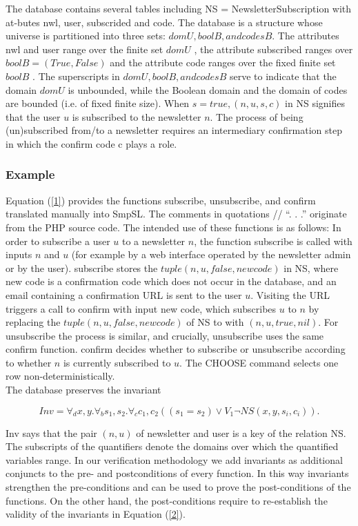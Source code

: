 \documentclass[12pt]{acmart}
\begin{document}
The database contains several tables including NS = NewsletterSubscription with at-butes nwl, user, subscrided and code. The database is a structure whose universe is partitioned into three sets: $domU, boolB, and codesB$. The attributes nwl and user range over the finite set $domU$  , the attribute subscribed ranges over $boolB =  (True, False)$ and the attribute code ranges over the fixed finite set $boolB$ . The superscripts in $domU, boolB, and codesB$ serve to indicate that the domain $domU$ is unbounded, while the Boolean domain and the domain of codes are bounded (i.e. of fixed finite size). When $s=true, (n,u,s,c )$ in NS signifies that the user $u$ is subscribed to the newsletter $n$. The process of being (un)subscribed from/to a newsletter requires an intermediary confirmation step in which the confirm code c plays a role. 

\subsubsection{Example}

Equation (\ref{1}) provides the functions subscribe, unsubscribe, and confirm translated manually into SmpSL. The comments in quotations // “. . .” originate from the PHP source code. The intended use of these functions is as follows: In order to subscribe a user $u$ to a newsletter $n$, the function subscribe is called with inputs $n$ and $u$ (for example by a web interface operated by the newsletter admin or by the user). subscribe stores the $tuple(n,u,false,new code)$ in NS, where new code is a confirmation code which does not occur in the database, and an email containing a confirmation URL is sent to the user $u$. Visiting the URL triggers a call to confirm with input new code, which subscribes $u$ to $n$ by replacing the $tuple(n,u,false,new code)$ of NS to with $(n,u,true,nil)$. For unsubscribe the process is similar, and crucially, unsubscribe uses the same confirm function. confirm decides whether to subscribe or unsubscribe according to whether $n$ is currently subscribed to $u$. The CHOOSE command selects one row non-deterministically.\\
The database preserves the invariant

\begin{equation}
    Inv = \forall_d x,y.\forall_b s_1,s_2.\forall_c c_1,c_2 ((s_1=s_2 )\vee V_1 \neg NS(x,y,s_i,c_i )).
    \label{1}
\end{equation}

 Inv says that the pair $(n, u)$ of newsletter and user is a key of the relation NS. The subscripts of the quantifiers denote the domains over which the quantified variables range. In our verification methodology we add invariants as additional conjuncts to the pre- and postconditions of every function. In this way invariants strengthen the pre-conditions and can be used to prove the post-conditions of the functions. On the other hand, the post-conditions require to re-establish the validity of the invariants in Equation (\ref{2}).
\end{document}
